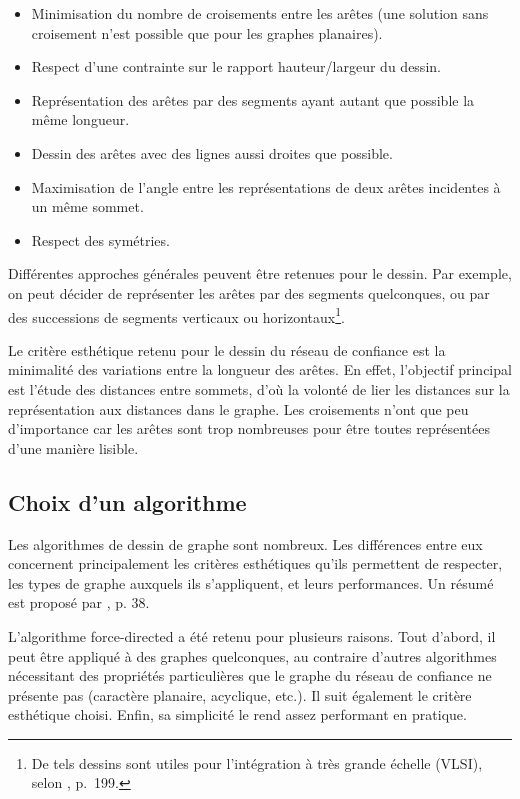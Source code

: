 \documentclass[a4paper]{article}
\begin{document}
\begin{itemize}
\item Minimisation du nombre de croisements entre les arêtes (une solution sans croisement n'est possible que pour les graphes planaires).
\item Respect d'une contrainte sur le rapport hauteur/largeur du dessin.
\item Représentation des arêtes par des segments ayant autant que possible la même longueur.
\item Dessin des arêtes avec des lignes aussi droites que possible.
\item Maximisation de l'angle entre les représentations de deux arêtes incidentes à un même sommet.
\item Respect des symétries.
\end{itemize}

Différentes approches générales peuvent être retenues pour le dessin. Par exemple, on peut décider de représenter les arêtes par des segments quelconques, ou par des successions de segments verticaux ou horizontaux\footnote{De tels dessins sont utiles pour l'intégration à très grande échelle (VLSI), selon \cite{IGT}, p.~199.}.

Le critère esthétique retenu pour le dessin du réseau de confiance est la minimalité des variations entre la longueur des arêtes. En effet, l'objectif principal est l'étude des distances entre sommets, d'où la volonté de lier les distances sur la représentation aux distances dans le graphe. Les croisements n'ont que peu d'importance car les arêtes sont trop nombreuses pour être toutes représentées d'une manière lisible.

\subsection{Choix d'un algorithme}

Les algorithmes de dessin de graphe sont nombreux. Les différences entre eux concernent principalement les critères esthétiques qu'ils permettent de respecter, les types de graphe auxquels ils s'appliquent, et leurs performances. Un résumé est proposé par \cite{GD}, p. 38.

L'algorithme force-directed a été retenu pour plusieurs raisons. Tout d'abord, il peut être appliqué à des graphes quelconques, au contraire d'autres algorithmes nécessitant des propriétés particulières que le graphe du réseau de confiance ne présente pas (caractère planaire, acyclique, etc.). Il suit également le critère esthétique choisi. Enfin, sa simplicité le rend assez performant en pratique.
\end{document}
